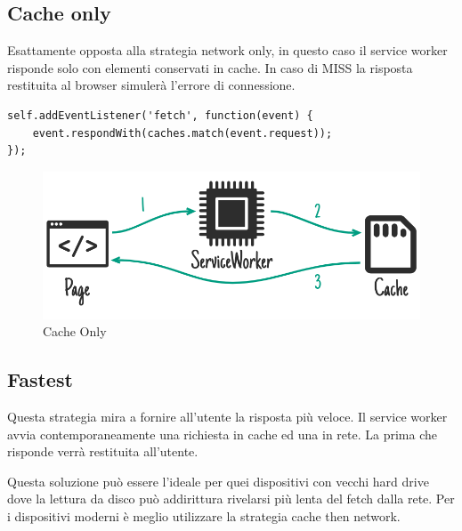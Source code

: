 \documentclass[italian]{article}
\begin{document}
\subsection{Cache only}
Esattamente opposta alla strategia network only, in questo caso il service worker risponde solo con elementi conservati in cache. In caso di MISS la risposta restituita al browser simulerà l’errore di connessione.
\begin{lstlisting}
self.addEventListener('fetch', function(event) {
	event.respondWith(caches.match(event.request));
});
\end{lstlisting}
\begin{figure}[h]
	\centering
	\includegraphics[width=1\linewidth]{Strategia4}
	\caption{Cache Only}
	\label{fig: Cache Only}
\end{figure}
\pagebreak
\subsection{Fastest}
Questa strategia mira a fornire all’utente la risposta più veloce. Il service worker avvia contemporaneamente una richiesta in cache ed una in rete. La prima che risponde verrà restituita all’utente.

Questa soluzione può essere l’ideale per quei dispositivi con vecchi hard drive dove la lettura da disco può addirittura rivelarsi più lenta del fetch dalla rete. Per i dispositivi moderni è meglio utilizzare la strategia cache then network.
\end{document}
